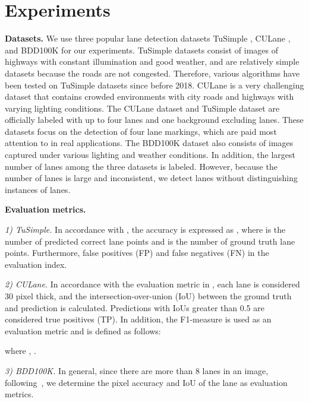 \documentclass[10pt,twocolumn,letterpaper]{article}
\begin{document}
\section{Experiments}
\noindent
\textbf{Datasets.} We use three popular lane detection datasets TuSimple \cite{tusimple}, CULane \cite{pan2017spatial}, and BDD100K \cite{yu2018bdd100k} for our experiments. TuSimple datasets consist of images of highways with constant illumination and good weather, and are relatively simple datasets because the roads are not congested. Therefore, various algorithms \cite{pan2017spatial, neven2018towards, ghafoorian2018gan, hou2019learning, jung2020towards} have been tested on TuSimple datasets since before 2018. CULane is a very challenging dataset that contains crowded environments with city roads and highways with varying lighting conditions. The CULane dataset and TuSimple dataset are officially labeled with up to four lanes and one background excluding lanes. These datasets focus on the detection of four lane markings, which are paid most attention to in real applications. The BDD100K dataset also consists of images captured under various lighting and weather conditions. In addition, the largest number of lanes among the three datasets is labeled. However, because the number of lanes is large and inconsistent, we detect lanes without distinguishing instances of lanes.

\noindent
\textbf{Evaluation metrics.} 

\noindent
\textit{1) TuSimple.} In accordance with \cite{tusimple}, the accuracy is expressed as , where  is the number of predicted correct lane points and  is the number of ground truth lane points. Furthermore, false positives (FP) and false negatives (FN) in the evaluation index.

\noindent
\textit{2) CULane.} In accordance with the evaluation metric in \cite{pan2017spatial}, each lane is considered 30 pixel thick, and the intersection-over-union (IoU) between the ground truth and prediction is calculated. Predictions with IoUs greater than 0.5 are considered true positives (TP). In addition, the F1-measure is used as an evaluation metric and is defined as follows:



\noindent
where , .

\noindent
\textit{3) BDD100K.} In general, since there are more than 8 lanes in an image, following~\cite{hou2019learning}, we determine the pixel accuracy and IoU of the lane as evaluation metrics.
\end{document}
